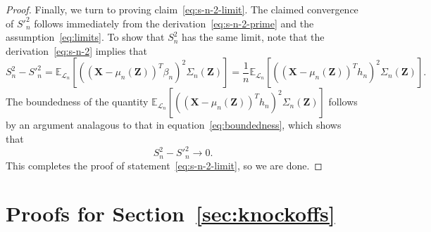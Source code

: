 \documentclass[ejs]{imsart}
\numberwithin{equation}{section}
\theoremstyle{plain}
\theoremstyle{definition}
\theoremstyle{remark}
\newcommand{\prx}{\bm X}
\newcommand{\prz}{\bm Z}
\begin{document}
\begin{proof}
	Finally, we turn to proving claim~\eqref{eq:s-n-2-limit}. The claimed convergence of $S'^2_n$ follows immediately from the derivation~\eqref{eq:s-n-2-prime} and the assumption~\eqref{eq:limits}. To show that $S_n^2$ has the same limit, note that the derivation~\eqref{eq:s-n-2} implies that 
	\begin{equation*}
		S_n^2 - S'^2_n	= \mathbb E_{\mathcal L_n}[((\prx - \mu_n(\prz))^T \beta_n)^2\Sigma_n(\prz)] = \frac{1}{n}\mathbb E_{\mathcal L_n}[((\prx - \mu_n(\prz))^T h_n)^2\Sigma_n(\prz)].
	\end{equation*}
	The boundedness of the quantity $\mathbb E_{\mathcal L_n}[((\prx - \mu_n(\prz))^T h_n)^2\Sigma_n(\prz)]$ follows by an argument analagous to that in equation~\eqref{eq:boundedness}, which shows that
	\begin{equation*}
		S_n^2 - S'^2_n \rightarrow 0.
	\end{equation*}	
	This completes the proof of statement~\eqref{eq:s-n-2-limit}, so we are done.
\end{proof}

\section{Proofs for Section~\ref{sec:knockoffs}} \label{sec:knockoffs-proofs}
\end{document}

